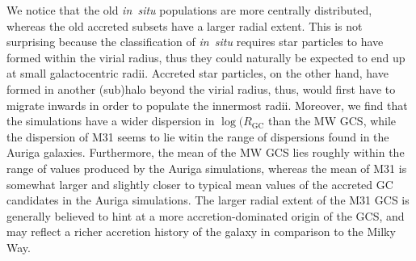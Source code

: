 \documentclass[a4paper,fleqn,usenatbib]{mnras}
\providecommand{\DIFadd}[1]{{\protect\color{blue}\uwave{#1}}} %
\providecommand{\DIFdel}[1]{{\protect\color{red}\sout{#1}}}                      %
\providecommand{\DIFaddbegin}{} %
\providecommand{\DIFaddend}{} %
\providecommand{\DIFdelbegin}{} %
\providecommand{\DIFdelend}{} %
\newcommand{\DIFscaledelfig}{0.5}
\newlength{\DIFdelgraphicswidth} %
\newlength{\DIFdelgraphicsheight} %
\newcommand{\DIFaddincludegraphics}[2][]{{\color{blue}\fbox{\DIFOincludegraphics[#1]{#2}}}} %
\newcommand{\DIFdelincludegraphics}[2][]{%
\sbox{\DIFdelgraphicsbox}{\DIFOincludegraphics[#1]{#2}}%
\settoboxwidth{\DIFdelgraphicswidth}{\DIFdelgraphicsbox} %
\settoboxtotalheight{\DIFdelgraphicsheight}{\DIFdelgraphicsbox} %
\scalebox{\DIFscaledelfig}{%
\parbox[b]{\DIFdelgraphicswidth}{\usebox{\DIFdelgraphicsbox}\\[-\baselineskip] \rule{\DIFdelgraphicswidth}{0em}}\llap{\resizebox{\DIFdelgraphicswidth}{\DIFdelgraphicsheight}{%
\setlength{\unitlength}{\DIFdelgraphicswidth}%
\begin{picture}(1,1)%
\thicklines\linethickness{2pt} %
{\color[rgb]{1,0,0}\put(0,0){\framebox(1,1){}}}%
{\color[rgb]{1,0,0}\put(0,0){\line( 1,1){1}}}%
{\color[rgb]{1,0,0}\put(0,1){\line(1,-1){1}}}%
\end{picture}%
}\hspace*{3pt}}} %
} %
\DeclareRobustCommand{\DIFaddbegin}{\DIFOaddbegin \let\includegraphics\DIFaddincludegraphics} %
\DeclareRobustCommand{\DIFaddend}{\DIFOaddend \let\includegraphics\DIFOincludegraphics} %
\DeclareRobustCommand{\DIFdelbegin}{\DIFOdelbegin \let\includegraphics\DIFdelincludegraphics} %
\DeclareRobustCommand{\DIFdelend}{\DIFOaddend \let\includegraphics\DIFOincludegraphics} %
\begin{document}
We notice that the old {\it in~situ} populations are more centrally 
distributed, whereas the old accreted subsets have a larger radial extent. This 
is not surprising because the classification of {\it in~situ} requires star particles 
to have formed within the virial radius, thus they could naturally be expected 
to end up at small galactocentric radii. Accreted star particles, on the other 
hand, have formed in another (sub)halo beyond the virial radius, thus, would 
first have to migrate inwards in order to populate the innermost radii. Moreover,
we find that the simulations have a wider dispersion in \DIFdelbegin \DIFdel{$\log(R_{\text{GC}}$ }\DIFdelend \DIFaddbegin \DIFadd{$\log(R_{\text{gal}})$ }\DIFaddend than
the MW GCS, while the dispersion of M31 seems to lie witin the range of dispersions
found in the Auriga galaxies. Furthermore, the mean of the MW GCS lies roughly 
within the range of values produced by the Auriga simulations, whereas the mean 
of M31 is somewhat larger and slightly closer to typical mean values of the 
accreted GC candidates in the Auriga simulations. The larger radial extent 
of the M31 GCS is generally believed to hint at a more accretion-dominated origin 
of the GCS, and may reflect a richer accretion history of the galaxy in comparison 
to the Milky Way.
\end{document}
